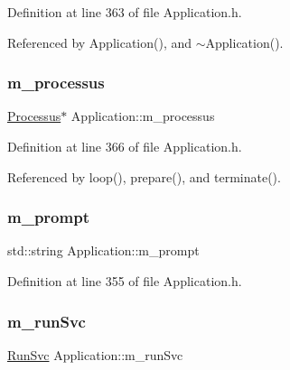 Definition at line 363 of file Application.\+h.



Referenced by Application(), and $\sim$\+Application().

\mbox{\label{classApplication_ab5eb4b3d3bef5ab9fce9c69401ce5786}} 
\subsubsection{\texorpdfstring{m\+\_\+processus}{m\_processus}}
{\footnotesize\ttfamily \hyperlink{classProcessus}{Processus}$\ast$ Application\+::m\+\_\+processus\hspace{0.3cm}{\ttfamily [private]}}



Definition at line 366 of file Application.\+h.



Referenced by loop(), prepare(), and terminate().

\mbox{\label{classApplication_a84f3f07f42ad77ad46cc8ef42d609948}} 
\subsubsection{\texorpdfstring{m\+\_\+prompt}{m\_prompt}}
{\footnotesize\ttfamily std\+::string Application\+::m\+\_\+prompt\hspace{0.3cm}{\ttfamily [protected]}}



Definition at line 355 of file Application.\+h.

\mbox{\label{classApplication_ad2c061af424280151c86b9b56d9724d3}} 
\subsubsection{\texorpdfstring{m\+\_\+run\+Svc}{m\_runSvc}}
{\footnotesize\ttfamily \hyperlink{Application_8h_a59643f52f9391fa83f137814aaae27ef}{Run\+Svc} Application\+::m\+\_\+run\+Svc\hspace{0.3cm}{\ttfamily [private]}}



